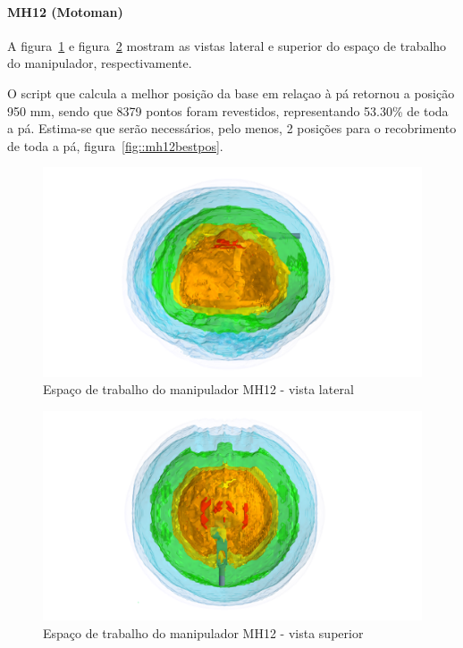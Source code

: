 \paragraph{MH12 (Motoman)}
A figura~\ref{fig::mh12cin1} e figura~\ref{fig::mh12cin2} mostram as vistas
lateral e superior do espaço de trabalho do manipulador, respectivamente.

O script que calcula a melhor posição da base em relaçao à pá retornou a posição
950 mm, sendo que 8379 pontos foram revestidos, representando 53.30\% de toda a
pá. Estima-se que serão necessários, pelo menos, 2 posições para o recobrimento
de toda a pá, figura~\ref{fig::mh12bestpos}.

\begin{figure}[h!]	
	\includegraphics[width=\columnwidth]{figs/bighatch/mh12_front.png}
	\caption{Espaço de trabalho do manipulador MH12 - vista lateral}
	\label{fig::mh12cin1}
\end{figure}

\begin{figure}[h!]	
	\includegraphics[width=\columnwidth]{figs/bighatch/mh12_top.png}
	\caption{Espaço de trabalho do manipulador MH12 - vista superior}
	\label{fig::mh12cin2}
\end{figure}


